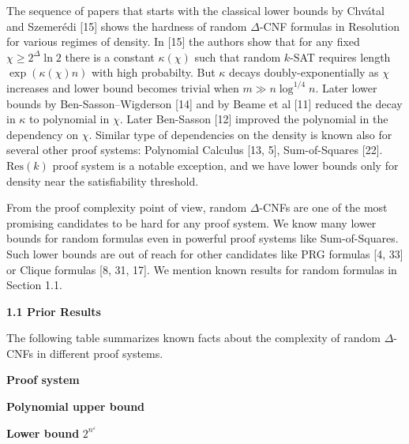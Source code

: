 \documentclass[10pt,a4paper]{article}
\begin{document}
The sequence of papers that starts with the classical lower bounds by Chvátal and Szemerédi
[15] shows the hardness of random $\Delta$-CNF formulas in Resolution for various regimes of
density. In [15] the authors show that for any fixed $\chi\geq 2^{\Delta}\ln 2$ there is a
constant $\kappa(\chi)$ such that random $k$-SAT requires length $\exp(\kappa(\chi)n)$ with high
probabilty. But $\kappa$ decays doubly-exponentially as $\chi$ increases and lower bound becomes trivial
when $m\gg n\log^{1/4}n$. Later lower bounds by Ben-Sasson–Wigderson [14] and by Beame et al
[11] reduced the decay in $\kappa$ to polynomial in $\chi$. Later Ben-Sasson [12]
improved the polynomial in the dependency on $\chi$. Similar type of dependencies on the density is known
also for several other proof systems: Polynomial Calculus [13, 5], Sum-of-Squares
[22]. $\mathrm{Res}(k)$ proof system is a notable exception, and we have lower bounds only for
density near the satisfiability threshold.\par




From the proof complexity point of view, random $\Delta$-CNFs are one of the most promising candidates to
be hard for any proof system. We know many lower bounds for random formulas even in powerful proof
systems like Sum-of-Squares. Such lower bounds are out of reach for other candidates like PRG formulas
[4, 33] or Clique formulas [8, 31, 17]. We mention known results
for random formulas in Section 1.1.\par





\par\medskip\noindent\textbf{
1.1 Prior Results}\par




The following table summarizes known facts about the complexity of random $\Delta$-CNFs in different
proof systems.

\par






\textbf{Proof system}




\textbf{Polynomial upper bound}




\textbf{Lower bound} $2^{n^{\varepsilon}}$
\end{document}
